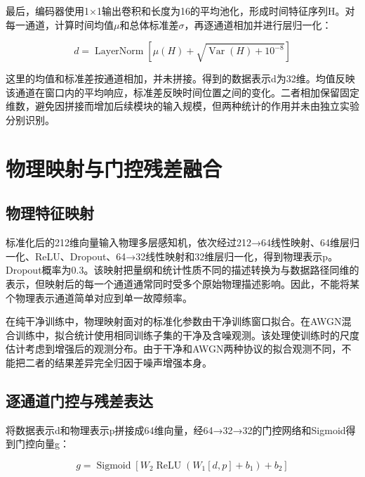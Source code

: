 \documentclass[UTF8,12pt,openany,twoside]{ctexbook}
\numberwithin{equation}{chapter}
\begin{document}
最后，编码器使用1×1输出卷积和长度为16的平均池化，形成时间特征序列H。对每一通道，计算时间均值\ensuremath{\mu}和总体标准差\ensuremath{\sigma}，再逐通道相加并进行层归一化：

\begin{equation}
\label{eq:auto10}
d=\operatorname{LayerNorm}\left[\mu(H)+\sqrt{\operatorname{Var}(H)+10^{-8}}\right]
\end{equation}


这里的均值和标准差按通道相加，并未拼接。得到的数据表示d为32维。均值反映该通道在窗口内的平均响应，标准差反映时间位置之间的变化。二者相加保留固定维数，避免因拼接而增加后续模块的输入规模，但两种统计的作用并未由独立实验分别识别。

\section{物理映射与门控残差融合}\label{ux7269ux7406ux6620ux5c04ux4e0eux95e8ux63a7ux6b8bux5deeux878dux5408}

\subsection{物理特征映射}\label{ux7269ux7406ux7279ux5f81ux6620ux5c04}

标准化后的212维向量输入物理多层感知机，依次经过212→64线性映射、64维层归一化、ReLU、Dropout、64→32线性映射和32维层归一化，得到物理表示p。Dropout概率为0.3。该映射把量纲和统计性质不同的描述转换为与数据路径同维的表示，但映射后的每一个通道通常同时受多个原始物理描述影响。因此，不能将某个物理表示通道简单对应到单一故障频率。

在纯干净训练中，物理映射面对的标准化参数由干净训练窗口拟合。在AWGN混合训练中，拟合统计使用相同训练子集的干净及含噪观测。该处理使训练时的尺度估计考虑到增强后的观测分布。由于干净和AWGN两种协议的拟合观测不同，不能把二者的结果差异完全归因于噪声增强本身。

\subsection{逐通道门控与残差表达}\label{ux9010ux901aux9053ux95e8ux63a7ux4e0eux6b8bux5deeux8868ux8fbe}

将数据表示d和物理表示p拼接成64维向量，经64→32→32的门控网络和Sigmoid得到门控向量g：

\begin{equation}
\label{eq:auto11}
g=\operatorname{Sigmoid}\left[W_2\operatorname{ReLU}\left(W_1[d,p]+b_1\right)+b_2\right]
\end{equation}
\end{document}
